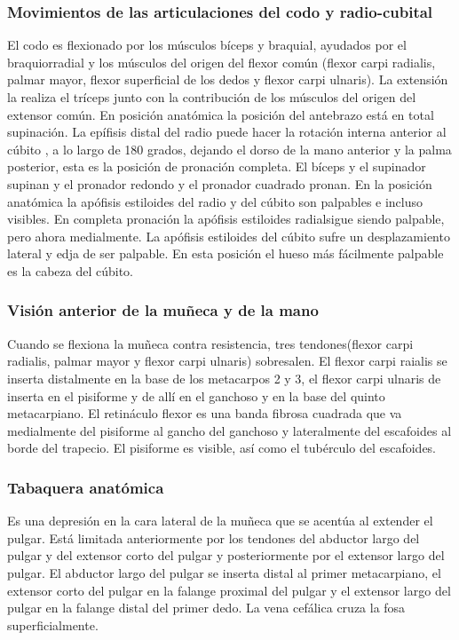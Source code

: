 \subsubsection{Movimientos de las articulaciones del codo y radio-cubital}
El codo es flexionado por los músculos bíceps y braquial, ayudados por el braquiorradial y los músculos del origen del flexor común (flexor carpi radialis, palmar mayor, flexor superficial de los dedos y flexor carpi ulnaris). La extensión la realiza el tríceps junto con la contribución de los músculos del origen del extensor común.
En posición anatómica la posición del antebrazo está en total supinación. La epífisis distal del radio puede hacer la rotación interna anterior al cúbito , a lo largo de 180 grados, dejando el dorso de la mano anterior y la palma posterior, esta es la posición de pronación completa. El bíceps y el supinador supinan y el pronador redondo y el pronador cuadrado pronan.
En la posición anatómica la apófisis estiloides del radio y del cúbito son palpables e incluso visibles. En completa pronación la apófisis estiloides radialsigue siendo palpable, pero ahora medialmente. La apófisis estiloides del cúbito sufre un desplazamiento lateral y edja de ser palpable. En esta posición el hueso más fácilmente palpable es la cabeza del cúbito.

\subsubsection{Visión anterior de la muñeca y de la mano}Cuando se flexiona la muñeca contra resistencia, tres tendones(flexor carpi radialis, palmar mayor y flexor carpi ulnaris) sobresalen. El flexor carpi raialis se inserta distalmente en la base de los metacarpos 2 y 3, el flexor carpi ulnaris de inserta en el pisiforme y de allí en el ganchoso y en la base del quinto metacarpiano.
El retináculo flexor es una banda fibrosa cuadrada que va medialmente del pisiforme al gancho del ganchoso y lateralmente del escafoides al borde del trapecio. El pisiforme es visible, así como el tubérculo del escafoides.

\subsubsection{Tabaquera anatómica}
Es una depresión en la cara lateral de la muñeca que se acentúa al extender el pulgar. Está limitada anteriormente por los tendones del abductor largo del pulgar y del extensor corto del pulgar y posteriormente por el extensor largo del pulgar. 
El abductor largo del pulgar se inserta distal al primer metacarpiano, el extensor corto del pulgar en la falange proximal del pulgar y el extensor largo del pulgar en la falange distal del primer dedo. La vena cefálica cruza la fosa superficialmente.

